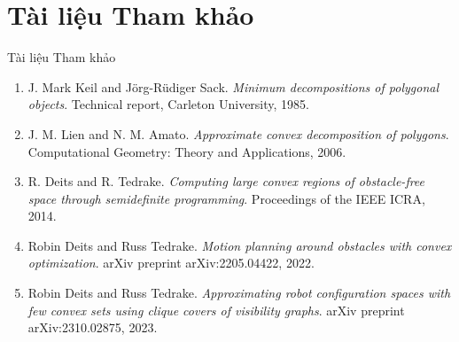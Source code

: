 \documentclass[aspectratio=169]{beamer}
\begin{document}
\section{Tài liệu Tham khảo}

\begin{frame}{Tài liệu Tham khảo}
    \small
    \begin{enumerate}
        \item J. Mark Keil and Jörg-Rüdiger Sack. \textit{Minimum decompositions of polygonal objects}. Technical report, Carleton University, 1985.
        
        \item J. M. Lien and N. M. Amato. \textit{Approximate convex decomposition of polygons}. Computational Geometry: Theory and Applications, 2006.
        
        \item R. Deits and R. Tedrake. \textit{Computing large convex regions of obstacle-free space through semidefinite programming}. Proceedings of the IEEE ICRA, 2014.
        
        \item Robin Deits and Russ Tedrake. \textit{Motion planning around obstacles with convex optimization}. arXiv preprint arXiv:2205.04422, 2022.
        
        \item Robin Deits and Russ Tedrake. \textit{Approximating robot configuration spaces with few convex sets using clique covers of visibility graphs}. arXiv preprint arXiv:2310.02875, 2023.
    \end{enumerate}
\end{frame}
\end{document}
